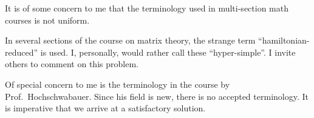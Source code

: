 \documentclass[draft]{sample}
\begin{document}
It is of some concern to me   that 
the terminology used in  multi-section
 math courses is not uniform.

In several sections of the course on 
matrix theory, the strange term   
 ``hamiltonian-reduced'' is used. 
  I, personally, would rather call these 
 ``hyper-simple''. I
invite others to comment on this  problem.

Of special concern to me is the terminology in the course 
by Prof.~Hochschwabauer.
Since his field is new, there is no accepted
terminology.   It is imperative 
that we arrive at a satisfactory solution.
\end{document}
